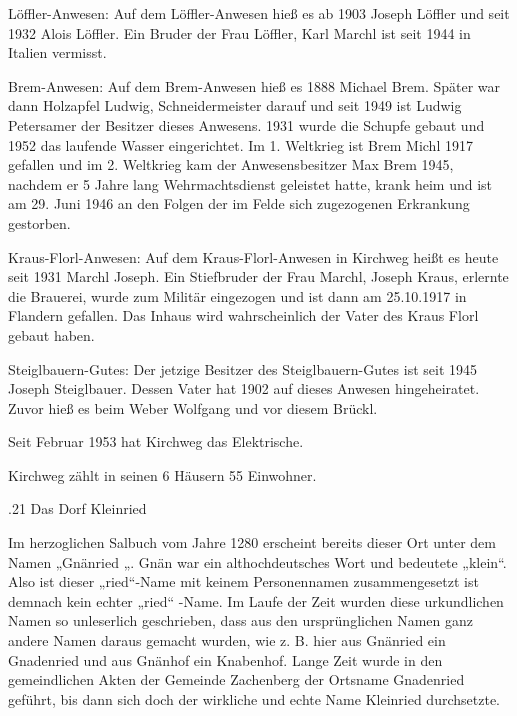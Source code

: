 \documentclass{book}
\begin{document}
Löffler-Anwesen: Auf dem Löffler-Anwesen hieß es ab 1903 Joseph Löffler und seit
1932 Alois Löffler. Ein Bruder der Frau Löffler, Karl Marchl ist seit 1944 in
Italien vermisst.

Brem-Anwesen: Auf dem Brem-Anwesen hieß es 1888 Michael Brem. Später war dann
Holzapfel Ludwig, Schneidermeister darauf und seit 1949 ist Ludwig Petersamer
der Besitzer dieses Anwesens. 1931 wurde die Schupfe gebaut und 1952 das
laufende Wasser eingerichtet. Im 1. Weltkrieg ist Brem Michl 1917 gefallen und
im 2. Weltkrieg kam der Anwesensbesitzer Max Brem 1945, nachdem er 5 Jahre lang
Wehrmachtsdienst geleistet hatte, krank heim und ist am 29. Juni 1946 an den
Folgen der im Felde sich zugezogenen Erkrankung gestorben.

Kraus-Florl-Anwesen: Auf dem Kraus-Florl-Anwesen in Kirchweg heißt es heute seit
1931 Marchl Joseph. Ein Stiefbruder der Frau Marchl, Joseph Kraus, erlernte die
Brauerei, wurde zum Militär eingezogen und ist dann am 25.10.1917 in Flandern
gefallen. Das Inhaus wird wahrscheinlich der Vater des Kraus Florl gebaut haben.

Steiglbauern-Gutes: Der jetzige Besitzer des Steiglbauern-Gutes ist seit 1945
Joseph Steiglbauer. Dessen Vater hat 1902 auf dieses Anwesen hingeheiratet.
Zuvor hieß es beim Weber Wolfgang und vor diesem Brückl.

Seit Februar 1953 hat Kirchweg das Elektrische.

Kirchweg zählt in seinen 6 Häusern 55 Einwohner.

.21 Das Dorf Kleinried

Im herzoglichen Salbuch vom Jahre 1280 erscheint bereits dieser Ort unter dem
Namen „Gnänried „. Gnän war ein althochdeutsches Wort und bedeutete „klein“.
Also ist dieser „ried“-Name mit keinem Personennamen zusammengesetzt ist demnach
kein echter „ried“ -Name. Im Laufe der Zeit wurden diese urkundlichen Namen so
unleserlich geschrieben, dass aus den ursprünglichen Namen ganz andere Namen
daraus gemacht wurden, wie z. B. hier aus Gnänried ein Gnadenried und aus
Gnänhof ein Knabenhof. Lange Zeit wurde in den gemeindlichen Akten der Gemeinde
Zachenberg der Ortsname Gnadenried geführt, bis dann sich doch der wirkliche und
echte Name Kleinried durchsetzte.
\end{document}
